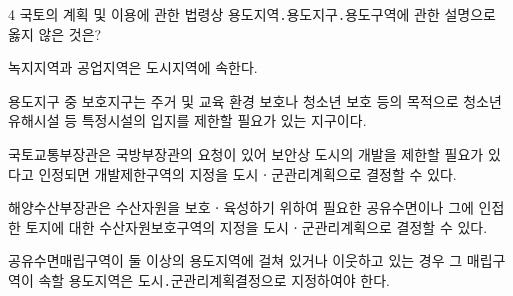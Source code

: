 \begin{question}{4}
국토의 계획 및 이용에 관한 법령상 용도지역․용도지구․용도구역에 관한 설명으로 옳지 않은 것은?
\begin{choices}
  \item 녹지지역과 공업지역은 도시지역에 속한다.
  \item 용도지구 중 보호지구는 주거 및 교육 환경 보호나 청소년 보호 등의 목적으로 청소년 유해시설 등 특정시설의 입지를 제한할 필요가 있는 지구이다.
  \item 국토교통부장관은 국방부장관의 요청이 있어 보안상 도시의 개발을 제한할 필요가 있다고 인정되면 개발제한구역의 지정을 도시ㆍ군관리계획으로 결정할 수 있다.
  \item 해양수산부장관은 수산자원을 보호ㆍ육성하기 위하여 필요한 공유수면이나 그에 인접한 토지에 대한 수산자원보호구역의 지정을 도시ㆍ군관리계획으로 결정할 수 있다.
  \item 공유수면매립구역이 둘 이상의 용도지역에 걸쳐 있거나 이웃하고 있는 경우 그 매립구역이 속할 용도지역은 도시․군관리계획결정으로 지정하여야 한다.
\end{choices}
\end{question}
